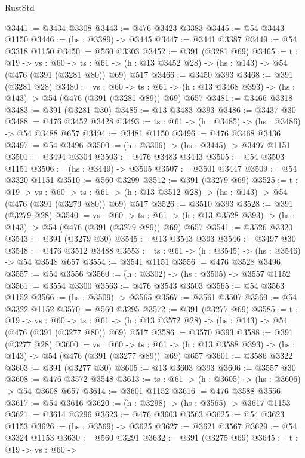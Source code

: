 \begin{lexlean}{RustStd}
\begin{coremodule}
@3441 := @3434 @3308
@3443 := @476 @3423 @3383
@3445 := @54 @3443 @1150
@3446 := (hs : @3389) -> @3445
@3447 := @3441 @3387
@3449 := @54 @3318 @1150
@3450 := @560 @3303
@3452 := @391 (@3281 @69)
@3465 := {t : @19} ->
  {vs : @60} ->
  {ts : @61} -> (h : @13 @3452 @28) -> (hs : @143) -> @54 (@476 (@391 (@3281 @80)) @69) @517
@3466 := @3450 @393
@3468 := @391 (@3281 @28)
@3480 := {vs : @60} ->
  {ts : @61} -> (h : @13 @3468 @393) -> (hs : @143) -> @54 (@476 (@391 (@3281 @89)) @69) @657
@3481 := @3466 @3318
@3483 := @391 (@3281 @30)
@3485 := @13 @3483 @393
@3486 := @3437 @30
@3488 := @476 @3452 @3428
@3493 := {ts : @61} -> (h : @3485) -> (hs : @3486) -> @54 @3488 @657
@3494 := @3481 @1150
@3496 := @476 @3468 @3436
@3497 := @54 @3496
@3500 := (h : @3306) -> (hs : @3445) -> @3497 @1151
@3501 := @3494 @3304
@3503 := @476 @3483 @3443
@3505 := @54 @3503 @1151
@3506 := (hs : @3449) -> @3505
@3507 := @3501 @3447
@3509 := @54 @3320 @1151
@3510 := @560 @3299
@3512 := @391 (@3279 @69)
@3525 := {t : @19} ->
  {vs : @60} ->
  {ts : @61} -> (h : @13 @3512 @28) -> (hs : @143) -> @54 (@476 (@391 (@3279 @80)) @69) @517
@3526 := @3510 @393
@3528 := @391 (@3279 @28)
@3540 := {vs : @60} ->
  {ts : @61} -> (h : @13 @3528 @393) -> (hs : @143) -> @54 (@476 (@391 (@3279 @89)) @69) @657
@3541 := @3526 @3320
@3543 := @391 (@3279 @30)
@3545 := @13 @3543 @393
@3546 := @3497 @30
@3548 := @476 @3512 @3488
@3553 := {ts : @61} -> (h : @3545) -> (hs : @3546) -> @54 @3548 @657
@3554 := @3541 @1151
@3556 := @476 @3528 @3496
@3557 := @54 @3556
@3560 := (h : @3302) -> (hs : @3505) -> @3557 @1152
@3561 := @3554 @3300
@3563 := @476 @3543 @3503
@3565 := @54 @3563 @1152
@3566 := (hs : @3509) -> @3565
@3567 := @3561 @3507
@3569 := @54 @3322 @1152
@3570 := @560 @3295
@3572 := @391 (@3277 @69)
@3585 := {t : @19} ->
  {vs : @60} ->
  {ts : @61} -> (h : @13 @3572 @28) -> (hs : @143) -> @54 (@476 (@391 (@3277 @80)) @69) @517
@3586 := @3570 @393
@3588 := @391 (@3277 @28)
@3600 := {vs : @60} ->
  {ts : @61} -> (h : @13 @3588 @393) -> (hs : @143) -> @54 (@476 (@391 (@3277 @89)) @69) @657
@3601 := @3586 @3322
@3603 := @391 (@3277 @30)
@3605 := @13 @3603 @393
@3606 := @3557 @30
@3608 := @476 @3572 @3548
@3613 := {ts : @61} -> (h : @3605) -> (hs : @3606) -> @54 @3608 @657
@3614 := @3601 @1152
@3616 := @476 @3588 @3556
@3617 := @54 @3616
@3620 := (h : @3298) -> (hs : @3565) -> @3617 @1153
@3621 := @3614 @3296
@3623 := @476 @3603 @3563
@3625 := @54 @3623 @1153
@3626 := (hs : @3569) -> @3625
@3627 := @3621 @3567
@3629 := @54 @3324 @1153
@3630 := @560 @3291
@3632 := @391 (@3275 @69)
@3645 := {t : @19} ->
  {vs : @60} ->

\end{coremodule}
\end{lexlean}
